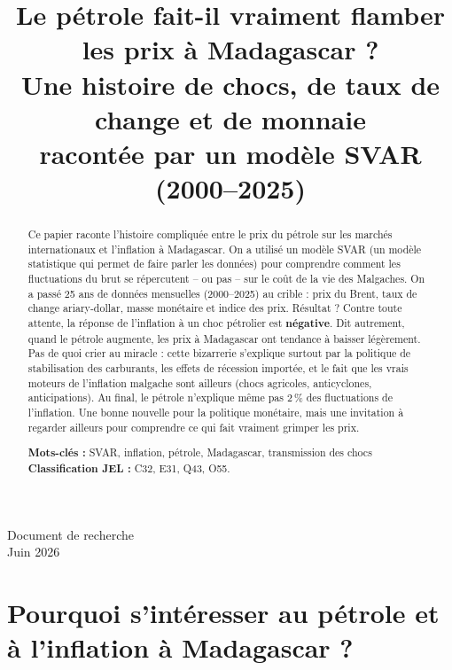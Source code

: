 \documentclass[12pt,a4paper]{article}
\title{\textbf{Le pétrole fait-il vraiment flamber les prix à Madagascar ?\\ Une histoire de chocs, de taux de change et de monnaie\\ racontée par un modèle SVAR (2000--2025)}}
\author{}
\date{}
\begin{document}
\maketitle
\thispagestyle{empty}

\begin{center}
  \large Document de recherche \\
  \vspace{0.3cm}
  \normalsize Juin 2026
\end{center}

\vspace{0.5cm}

\begin{abstract}
\noindent Ce papier raconte l'histoire compliquée entre le prix du pétrole sur les marchés internationaux et l'inflation à Madagascar. On a utilisé un modèle SVAR (un modèle statistique qui permet de faire parler les données) pour comprendre comment les fluctuations du brut se répercutent -- ou pas -- sur le coût de la vie des Malgaches. On a passé 25 ans de données mensuelles (2000--2025) au crible : prix du Brent, taux de change ariary-dollar, masse monétaire et indice des prix. Résultat ? Contre toute attente, la réponse de l'inflation à un choc pétrolier est \textbf{négative}. Dit autrement, quand le pétrole augmente, les prix à Madagascar ont tendance à baisser légèrement. Pas de quoi crier au miracle : cette bizarrerie s'explique surtout par la politique de stabilisation des carburants, les effets de récession importée, et le fait que les vrais moteurs de l'inflation malgache sont ailleurs (chocs agricoles, anticyclones, anticipations). Au final, le pétrole n'explique même pas 2\,\% des fluctuations de l'inflation. Une bonne nouvelle pour la politique monétaire, mais une invitation à regarder ailleurs pour comprendre ce qui fait vraiment grimper les prix.
\vspace{0.3cm}

\noindent\textbf{Mots-clés :} SVAR, inflation, pétrole, Madagascar, transmission des chocs \\
\textbf{Classification JEL :} C32, E31, Q43, O55.
\end{abstract}

\newpage

\tableofcontents
\newpage

\section{Pourquoi s'intéresser au pétrole et à l'inflation à Madagascar ?}
\end{document}

